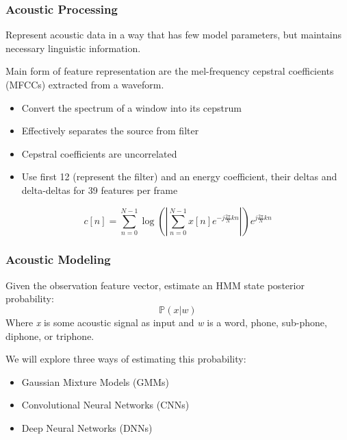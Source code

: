 \documentclass[notes]{beamer}
\newcommand{\cprob}[2]{ \prob{#1 \lvert #2} }
\newcommand{\prob}[1]{\mathbb{P}\left( #1 \right)}
\begin{document}
\begin{frame}
	\frametitle{Acoustic Processing}
	\begin{center}
		Represent acoustic data in a way that has few model parameters, but maintains necessary linguistic information.
	\end{center}
	\begin{center}
		Main form of feature representation are the mel-frequency cepstral coefficients (MFCCs) extracted from a waveform.
	\end{center}
	
	\begin{itemize}
		\item Convert the spectrum of a window into its cepstrum
		\item Effectively separates the source from filter
		\item Cepstral coefficients are uncorrelated
		\item Use first 12 (represent the filter) and an energy coefficient, their deltas and delta-deltas for 39 features per frame
	\end{itemize}
	
	\begin{equation*}
		c[n] = \sum_{n=0}^{N-1}\log(|\sum_{n=0}^{N-1}x[n]e^{-j\frac{2\pi}{N}kn}|)e^{j\frac{2\pi}{N}kn}
	\end{equation*}
\end{frame}

\begin{frame}
	\frametitle{Acoustic Modeling}
	\begin{center}
		Given the observation feature vector, estimate an HMM state posterior probability: \begin{equation*}
		\cprob{x}{w}\end{equation*} Where \textit{x} is some acoustic signal as input and \textit{w} is a word, phone, sub-phone, diphone, or triphone. 
	\end{center}
	
	We will explore three ways of estimating this probability:
	\begin{itemize}
		\item Gaussian Mixture Models (GMMs)
		\item Convolutional Neural Networks (CNNs)
		\item Deep Neural Networks (DNNs)
	\end{itemize}
\end{frame}
\end{document}
